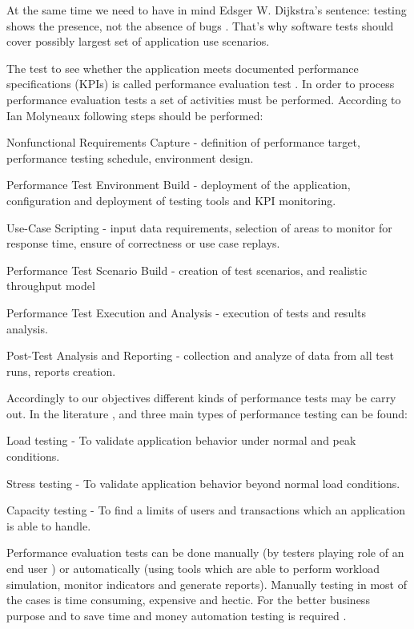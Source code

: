 \documentclass[10pt,a4paper]{article}
\let\tempone\itemize
\let\temptwo\enditemize
\renewenvironment{itemize}{\tempone\addtolength{\itemsep}{-0.4\baselineskip}}{\temptwo}
\begin{document}
At the same time we need to have in mind Edsger W. Dijkstra's sentence:
testing shows the presence, not the absence of bugs \cite{set}. That's why  software tests should cover possibly largest set of application use scenarios.  

The test to see whether the application meets documented performance specifications (KPIs) is called performance evaluation test \cite{arttest}. 
In order to process performance evaluation tests a set of activities must be performed. According to Ian Molyneaux \cite{artperformance} following steps should be performed:
\begin{itemize}
\item Nonfunctional Requirements Capture - definition of performance target, performance testing schedule, environment design.
\item Performance Test Environment Build - deployment of the application, configuration and deployment of testing tools and KPI monitoring.
\item Use-Case Scripting - input data requirements, selection of areas to monitor for response time, ensure of correctness or use case replays.
\item Performance Test Scenario Build - creation of test scenarios, and realistic throughput model
\item Performance Test Execution and Analysis - execution of tests and results analysis.
\item Post-Test Analysis and Reporting - collection and analyze of  data from all test runs, reports creation.
\end{itemize}

Accordingly to our objectives different kinds of performance tests may be carry out. In the literature \cite{artperformance},\cite{architectingperformance} and \cite{analysisofpet} three main types of performance testing can be found:
\begin{itemize}
 \item Load testing - To validate application behavior under normal and peak conditions.
 \item Stress testing - To validate application behavior beyond normal load conditions.
 \item Capacity testing - To find a limits of users and transactions which an application is able to handle.
\end{itemize}

Performance evaluation tests can be done manually (by testers playing role of an end user \cite{comparison}) or automatically (using tools which are able to perform workload simulation, monitor indicators and generate reports). Manually testing in most of the cases is time consuming, expensive and hectic. For the better business purpose and to save time and money automation testing is required \cite{automaiontools}.
\end{document}
